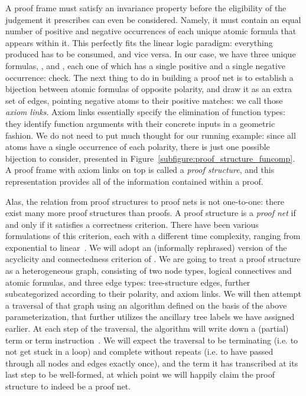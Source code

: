 A proof frame must satisfy an invariance property before the eligibility of the judgement it prescribes can even be considered.
Namely, it must contain an equal number of positive and negative occurrences of each unique atomic formula that appears within it.
This perfectly fits the linear logic paradigm: everything produced has to be consumed, and vice versa.
In our case, we have three unique formulas, ,  and , each one of which has a single positive and a single negative occurrence: check.
The next thing to do in building a proof net is to establish a bijection between atomic formulas of opposite polarity, and draw it as an extra set of edges, pointing negative atoms to their positive matches: we call those \textit{axiom links}.
Axiom links essentially specify the elimination of function types: they identify function arguments with their concrete inputs in a geometric fashion.
We do not need to put much thought for our running example: since all atoms have a single occurrence of each polarity, there is just one possible bijection to consider, presented in Figure~\ref{subfigure:proof_structure_funcomp}.
A proof frame with axiom links on top is called a \textit{proof structure}, and this representation provides all of the information contained within a proof.

Alas, the relation from proof structures to proof nets is not one-to-one: there exist many more proof structures than proofs.
A proof structure is a \textit{proof net} if and only if it satisfies a correctness criterion.
There have been various formulations of this criterion, each with a different time complexity, ranging from exponential to linear~\cite{girard1987linear,danos1989structure,murawski2000dominator,guerrini2011linear}.
We will adopt an (informally rephrased) version of the acyclicity and connectedness criterion of \citet{danos1989structure}.
We are going to treat a proof structure as a heterogeneous graph, consisting of two node types, logical connectives and atomic formulas, and three edge types: tree-structure edges, further subcategorized according to their polarity, and axiom links.
We will then attempt a traversal of that graph using an algorithm defined on the basis of the above parameterization, that further utilizes the  ancillary tree labels we have assigned earlier.
At each step of the traversal, the algorithm will write down a (partial) term or term instruction~\cite{de1996semantic,lamarche2008proof}.
We will expect the traversal to be terminating (i.e. to not get stuck in a loop) and complete without repeats (i.e. to have passed through all nodes and edges exactly once), and the term it has transcribed at its last step to be well-formed, at which point we will happily claim the proof structure to indeed be a proof net.

